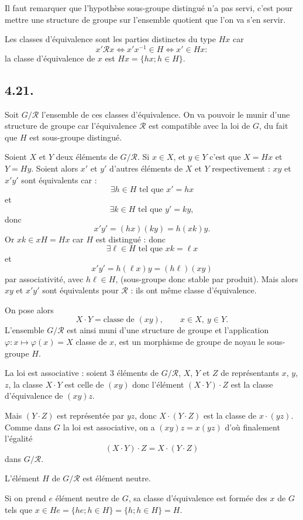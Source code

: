 Il faut remarquer que l'hypothèse sous-groupe distingué n'a pas servi, c'est pour mettre une structure de groupe sur l'ensemble quotient que l'on va s'en servir.

Les classes d'équivalence sont les parties distinctes du type $Hx$ car
\[
x'\mathcal R x\Longleftrightarrow x'x^{-1}\in H\Longleftrightarrow x'\in Hx :
\]
la classe d'équivalence de $x$ est $Hx=\{hx;h\in H\}$.

\subsection*{4.21.}
Soit $G/\mathcal R$ l'ensemble de ces classes d'équivalence. On va pouvoir le munir d'une structure de groupe car l'équivalence $\mathcal R$ est compatible avec la loi de $G$, du fait que $H$ est sous-groupe distingué.

Soient $X$ et $Y$ deux éléments de $G/\mathcal R$. Si $x\in X$, et $y\in Y$ c'est que $X=Hx$ et $Y=Hy$. Soient alors $x'$ et $y'$ d'autres éléments de $X$ et $Y$ respectivement : $xy$ et $x'y'$ sont équivalents car :
\[
\exists h\in H\text{ tel que }x'=hx
\]
et
\[
\exists k\in H\text{ tel que }y'=ky,
\]
donc
\[
x'y'=(hx)(ky)=h(xk)y.
\]
Or $xk\in xH=Hx$ car $H$ est distingué : donc
\[
\exists\ell\in H\text{ tel que }xk=\ell x
\]
et
\[
x'y'=h(\ell x)y=(h\ell)(xy)
\]
par associativité, avec $h\ell\in H$, (sous-groupe donc stable par produit). Mais alors $xy$ et $x'y'$ sont équivalents pour $\mathcal R$ : ils ont même classe d'équivalence.

On pose alors
\[
X\cdot Y=\text{classe de }(xy),\qquad x\in X,\ y\in Y.
\]
L'ensemble $G/\mathcal R$ est ainsi muni d'une structure de groupe et l'application $\varphi:x\mapsto\varphi(x)=X$ classe de $x$, est un morphisme de groupe de noyau le sous-groupe $H$.

La loi est associative : soient 3 éléments de $G/\mathcal R$, $X$, $Y$ et $Z$ de représentants $x$, $y$, $z$, la classe $X\cdot Y$ est celle de $(xy)$ donc l'élément $(X\cdot Y)\cdot Z$ est la classe d'équivalence de $(xy)z$.

Mais $(Y\cdot Z)$ est représentée par $yz$, donc $X\cdot(Y\cdot Z)$ est la classe de $x\cdot(yz)$. Comme dans $G$ la loi est associative, on a $(xy)z=x(yz)$ d'où finalement l'égalité
\[
(X\cdot Y)\cdot Z=X\cdot(Y\cdot Z)
\]
dans $G/\mathcal R$.

L'élément $H$ de $G/\mathcal R$ est élément neutre.

Si on prend $e$ élément neutre de $G$, sa classe d'équivalence est formée des $x$ de $G$ tels que $x\in He=\{he;h\in H\}=\{h;h\in H\}=H$.

